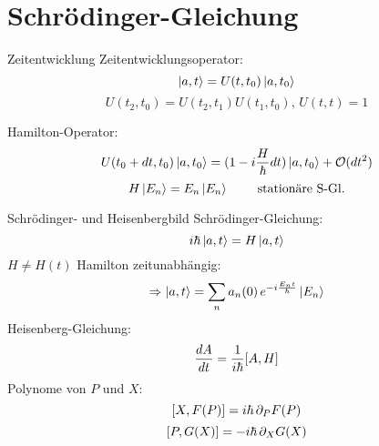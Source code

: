 \section{Schrödinger-Gleichung}

\begin{subbox}{Zeitentwicklung}
Zeitentwicklungsoperator:
\[ \ket{a, t} = U(t, t_0) \ket{a, t_0} \]
\[ U(t_2, t_0) = U(t_2, t_1) U(t_1, t_0), \, U(t,t) = 1 \]

Hamilton-Operator:
\[ U(t_0 + dt, t_0) \ket{a, t_0} = (1-i\frac{H}{\hbar} dt ) \ket{a, t_0} + \mathcal{O}(dt^2) \]
\[ H\ket{E_n} = E_n \ket{E_n} \hspace{.8cm} \text{stationäre S-Gl.}\] 
\end{subbox}

\begin{mainbox}{Schrödinger- und Heisenbergbild}
Schrödinger-Gleichung:
\[ i\hbar \ket{a,t} = H \ket{a,t}    \]
\( H \neq H(t) \) Hamilton zeitunabhängig:
\[ \Rightarrow \ket{a, t} = \sum_n a_n(0) \, e^{-i \frac{E_n t}{\hbar}} \ket{E_n} \]
\vspace*{.5cm}
Heisenberg-Gleichung:
\[ \frac{dA}{dt} = \frac{1}{i\hbar} \comm{A}{H} \]
Polynome von $P$ und $X$:
\[ \comm{X}{F(P)} = i\hbar\,\partial_P F(P) \]
\[ \comm{P}{G(X)} = -i\hbar\,\partial_X G(X) \]
\end{mainbox}